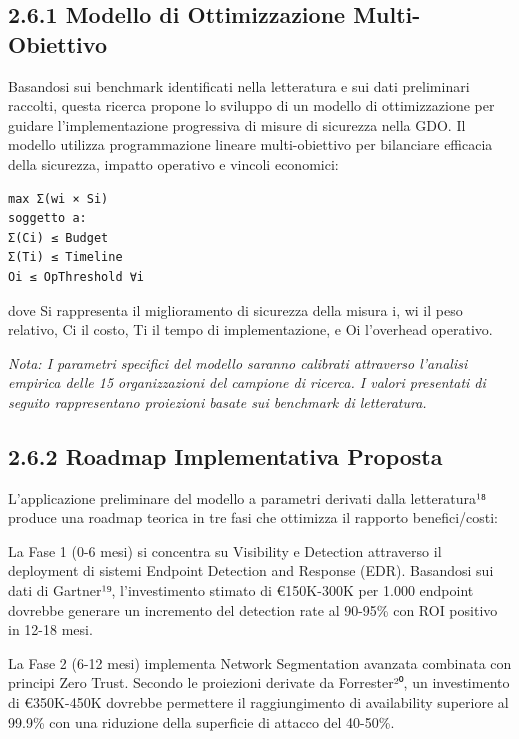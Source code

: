 \documentclass[12pt,a4paper,oneside]{book}
\numberwithin{figure}{chapter} %
\numberwithin{table}{chapter}  %
\begin{document}
\subsection{2.6.1 Modello di Ottimizzazione
Multi-Obiettivo}\label{modello-di-ottimizzazione-multi-obiettivo}

Basandosi sui benchmark identificati nella letteratura e sui dati
preliminari raccolti, questa ricerca propone lo sviluppo di un modello
di ottimizzazione per guidare l'implementazione progressiva di misure di
sicurezza nella GDO. Il modello utilizza programmazione lineare
multi-obiettivo per bilanciare efficacia della sicurezza, impatto
operativo e vincoli economici:

\begin{verbatim}
max Σ(wi × Si)
soggetto a:
Σ(Ci) ≤ Budget
Σ(Ti) ≤ Timeline
Oi ≤ OpThreshold ∀i
\end{verbatim}

dove Si rappresenta il miglioramento di sicurezza della misura i, wi il
peso relativo, Ci il costo, Ti il tempo di implementazione, e Oi
l'overhead operativo.

\emph{Nota: I parametri specifici del modello saranno calibrati
attraverso l'analisi empirica delle 15 organizzazioni del campione di
ricerca. I valori presentati di seguito rappresentano proiezioni basate
sui benchmark di letteratura.}

\subsection{2.6.2 Roadmap Implementativa
Proposta}\label{roadmap-implementativa-proposta}

L'applicazione preliminare del modello a parametri derivati dalla
letteratura¹⁸ produce una roadmap teorica in tre fasi che ottimizza il
rapporto benefici/costi:

La Fase 1 (0-6 mesi) si concentra su Visibility e Detection attraverso
il deployment di sistemi Endpoint Detection and Response (EDR).
Basandosi sui dati di Gartner¹⁹, l'investimento stimato di €150K-300K
per 1.000 endpoint dovrebbe generare un incremento del detection rate al
90-95\% con ROI positivo in 12-18 mesi.

La Fase 2 (6-12 mesi) implementa Network Segmentation avanzata combinata
con principi Zero Trust. Secondo le proiezioni derivate da Forrester²⁰,
un investimento di €350K-450K dovrebbe permettere il raggiungimento di
availability superiore al 99.9\% con una riduzione della superficie di
attacco del 40-50\%.
\end{document}
